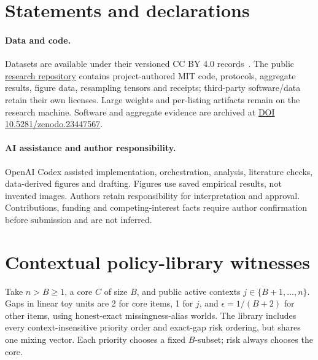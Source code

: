\documentclass[11pt]{article}
\begin{document}
\section*{Statements and declarations}
\paragraph{Data and code.}
Datasets are available under their versioned CC BY 4.0 records~\cite{jucarsdata,mucarsdata}.
The public \href{https://github.com/T0Q0R/secondhand-valuation-research}{research repository}
contains project-authored MIT code, protocols, aggregate results, figure data,
resampling tensors and receipts; third-party software/data retain their own
licenses. Large weights and per-listing artifacts remain on the research
machine. Software and aggregate evidence are archived at
\href{https://doi.org/10.5281/zenodo.23447567}{DOI 10.5281/zenodo.23447567}.

\paragraph{AI assistance and author responsibility.}
OpenAI Codex assisted implementation, orchestration, analysis, literature
checks, data-derived figures and drafting. Figures use saved empirical
results, not invented images. Authors retain responsibility for interpretation
and approval. Contributions, funding and competing-interest facts require
author confirmation before submission and are not inferred.

\clearpage
\appendix
\section{Contextual policy-library witnesses}\label{app:library}
Take $n>B\ge1$, a core $C$ of size $B$, and public active contexts
$j\in\{B+1,\ldots,n\}$. Gaps in linear toy units are 2 for core items,
1 for $j$, and $\epsilon=1/(B+2)$ for other items, using honest-exact
missingness-alias worlds. The library includes every context-insensitive
priority order and exact-gap risk ordering, but shares one mixing vector.
Each priority chooses a fixed $B$-subset; risk always chooses the core.
\end{document}
